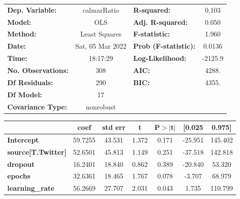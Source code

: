 \begin{center}
\begin{tabular}{lclc}
\toprule
\textbf{Dep. Variable:}                   &   calmarRatio    & \textbf{  R-squared:         } &     0.103   \\
\textbf{Model:}                           &       OLS        & \textbf{  Adj. R-squared:    } &     0.050   \\
\textbf{Method:}                          &  Least Squares   & \textbf{  F-statistic:       } &     1.960   \\
\textbf{Date:}                            & Sat, 05 Mar 2022 & \textbf{  Prob (F-statistic):} &   0.0136    \\
\textbf{Time:}                            &     18:17:29     & \textbf{  Log-Likelihood:    } &   -2125.9   \\
\textbf{No. Observations:}                &         308      & \textbf{  AIC:               } &     4288.   \\
\textbf{Df Residuals:}                    &         290      & \textbf{  BIC:               } &     4355.   \\
\textbf{Df Model:}                        &          17      & \textbf{                     } &             \\
\textbf{Covariance Type:}                 &    nonrobust     & \textbf{                     } &             \\
\bottomrule
\end{tabular}
\begin{tabular}{lcccccc}
                                          & \textbf{coef} & \textbf{std err} & \textbf{t} & \textbf{P$> |$t$|$} & \textbf{[0.025} & \textbf{0.975]}  \\
\midrule
\textbf{Intercept}                        &      59.7255  &       43.531     &     1.372  &         0.171        &      -25.951    &      145.402     \\
\textbf{source[T.Twitter]}                &      52.6501  &       45.813     &     1.149  &         0.251        &      -37.518    &      142.818     \\
\textbf{dropout}                          &      16.2401  &       18.840     &     0.862  &         0.389        &      -20.840    &       53.320     \\
\textbf{epochs}                           &      32.6361  &       18.465     &     1.767  &         0.078        &       -3.707    &       68.979     \\
\textbf{learning\_rate}                   &      56.2669  &       27.707     &     2.031  &         0.043        &        1.735    &      110.799     \\

\end{tabular}
\end{center}
